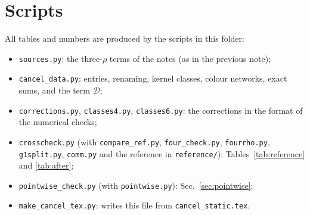 \documentclass[10pt]{article}
\numberwithin{equation}{section}
\begin{document}
\section{Scripts}\label{app:scripts}
All tables and numbers are produced by the scripts in this folder:
\begin{itemize}
\item \texttt{sources.py}: the three-$\rho$ terms of the notes (as in the previous note);
\item \texttt{cancel\_data.py}: entries, renaming, kernel classes, colour networks, exact sums, and the term $\mathcal D$;
\item \texttt{corrections.py}, \texttt{classes4.py}, \texttt{classes6.py}: the corrections in the format of the numerical checks;
\item \texttt{crosscheck.py} (with \texttt{compare\_ref.py}, \texttt{four\_check.py}, \texttt{fourrho.py}, \texttt{g1split.py}, \texttt{comm.py} and the reference in \texttt{reference/}): Tables~\ref{tab:reference} and \ref{tab:after};
\item \texttt{pointwise\_check.py} (with \texttt{pointwise.py}): Sec.~\ref{sec:pointwise};
\item \texttt{make\_cancel\_tex.py}: writes this file from \texttt{cancel\_static.tex}.
\end{itemize}
\end{document}
